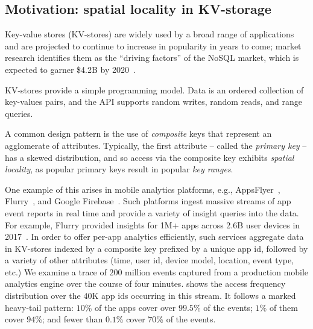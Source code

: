 \subsection{Motivation:  spatial locality in KV-storage}

Key-value stores (KV-stores) are widely used  by a broad range of applications and are projected
to continue to increase in popularity in years to come; market research  identifies them as the 
``driving factors'' of the NoSQL market, which is expected to garner \$4.2B by 2020~\cite{alliedmarketresearch}.

KV-stores provide a simple programming model. 
Data is an ordered collection of key-values pairs, and  the API supports random writes, 
random reads, and range queries. 

A common design pattern is the use of \emph{composite} keys that represent an agglomerate of attributes.
Typically, the first attribute -- called the \emph{primary key} -- has a skewed distribution, and so   access via the composite key exhibits \emph{spatial locality}, as 
popular primary keys result in popular \emph{key ranges}. 

One example of this arises in mobile analytics platforms, e.g., AppsFlyer~\cite{appsflyer}, Flurry~\cite{flurry}, 
and Google Firebase~\cite{firebase}. %
Such platforms %
ingest massive streams of app event reports %
in  real time and provide a variety of insight queries into the data. For example, Flurry provided insights for  
1M+ apps across 2.6B user devices  in 2017~\cite{FlurryReport2017}. In order to offer per-app analytics efficiently,
such services aggregate data in KV-stores indexed by a composite key prefixed by a unique app 
id,  followed by a variety of other attributes (time, user id, device model, location, event type, etc.)
%
We examine a trace of $200$ million events captured from a production mobile analytics engine over the course of four minutes.  
 shows the access frequency distribution over the  $40$K app ids occurring in this stream. It follows a marked
heavy-tail pattern: $10$\% of the apps cover over $99.5$\% of the events; $1$\% of them  cover $94$\%; and fewer 
than $0.1$\% cover $70$\% of the events. 

